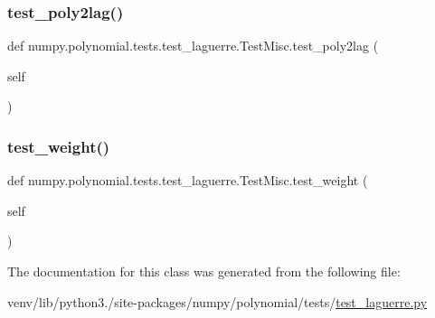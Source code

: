 \subsubsection{\texorpdfstring{test\+\_\+poly2lag()}{test\_poly2lag()}}
{\footnotesize\ttfamily def numpy.\+polynomial.\+tests.\+test\+\_\+laguerre.\+Test\+Misc.\+test\+\_\+poly2lag (\begin{DoxyParamCaption}\item[{}]{self }\end{DoxyParamCaption})}

\mbox{\label{classnumpy_1_1polynomial_1_1tests_1_1test__laguerre_1_1TestMisc_a587c8b8da244a959b1b7e1ff25f72cd3}} 
\subsubsection{\texorpdfstring{test\+\_\+weight()}{test\_weight()}}
{\footnotesize\ttfamily def numpy.\+polynomial.\+tests.\+test\+\_\+laguerre.\+Test\+Misc.\+test\+\_\+weight (\begin{DoxyParamCaption}\item[{}]{self }\end{DoxyParamCaption})}



The documentation for this class was generated from the following file\+:\begin{DoxyCompactItemize}
\item 
venv/lib/python3./site-\/packages/numpy/polynomial/tests/\hyperlink{test__laguerre_8py}{test\+\_\+laguerre.\+py}\end{DoxyCompactItemize}
